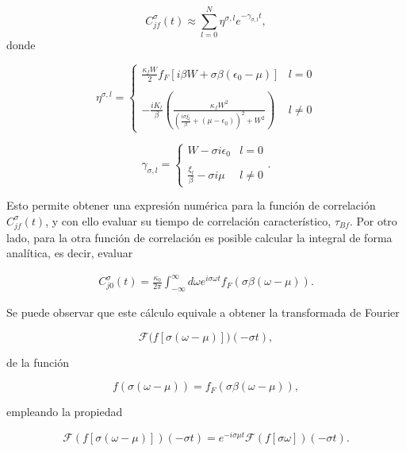 \begin{appendixs}
\begin{equation}
    C^{\sigma}_{jf}(t) \approx \sum_{l=0}^{N} \eta^{\sigma,l} e^{-\gamma_{\sigma,l} t},
    \label{correlationf}
\end{equation}
donde 

\begin{equation*}
    \eta^{\sigma,l} = \left\{ \begin{array}{lc} \frac{\kappa_{f}W}{2} f_{F}[i\beta W + \sigma \beta (\epsilon_{0}-\mu)]  & l = 0 \\ \\ - \frac{iK_{l}}{\beta} \left(\frac{\kappa_{f}W^{2}}{ (\frac{i\sigma \xi_{l}}{\beta} + (\mu-\epsilon_{0}))^{2} + W^{2} } \right) &  l \neq 0 \end{array} \right.
\end{equation*}

\begin{equation*}
    \gamma_{\sigma,l} =  \left\{ \begin{array}{lc} W- \sigma i \epsilon_{0}  & l = 0 \\ \\ \frac{\xi_{l}}{\beta} - \sigma i \mu &  l \neq 0 \end{array} \right..
\end{equation*}

Esto permite obtener una expresión numérica para la función de correlación $C^{\sigma}_{jf}(t)$, y con ello evaluar su tiempo de correlación característico, $\tau_{Bf}$. Por otro lado, para la otra función de correlación es posible calcular la integral de forma analítica, es decir, evaluar

\begin{align*}
       C_{j0}^{\sigma}(t) = \frac{\kappa_{0}}{2\pi} \int_{-\infty}^{\infty} d\omega e^{i\sigma \omega t }f_{F}(\sigma \beta (\omega -  \mu)).
\end{align*}    

Se puede  observar que este cálculo equivale a obtener la transformada de Fourier 

\[
\mathcal{F}\big(f[\sigma (\omega - \mu)]\big)(-\sigma t),
\]

de la función 

\[
f(\sigma(\omega-\mu)) = f_{F}(\sigma \beta (\omega-\mu)),
\]

empleando la propiedad

\begin{equation}
\mathcal{F}(f[\sigma (\omega - \mu)])(-\sigma t) = e^{-i \sigma \mu t}\mathcal{F}(f[\sigma \omega])(-\sigma t).
\label{apendiceprop}
\end{equation}


\end{appendixs}
